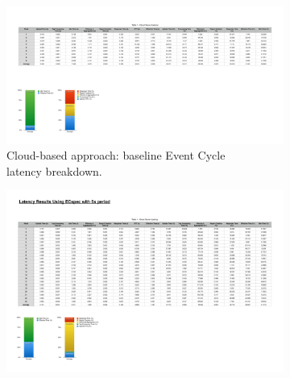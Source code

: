 \begin{figure}[ht!]
  \centering
  \begin{subfigure}{.5\textwidth}
    \centering
    \includegraphics[height=\linewidth]{./images/cloud_ecspec_breakdown}
    \caption{Cloud-based approach: baseline Event Cycle\\latency breakdown.}
    \label{fig:ecspecf_base}
  \end{subfigure}%
  \begin{subfigure}{.5\textwidth}
    \centering
    \includegraphics[height=\linewidth]{./images/cloud_ecspecf_breakdown}

\end{subfigure}
\end{figure}
